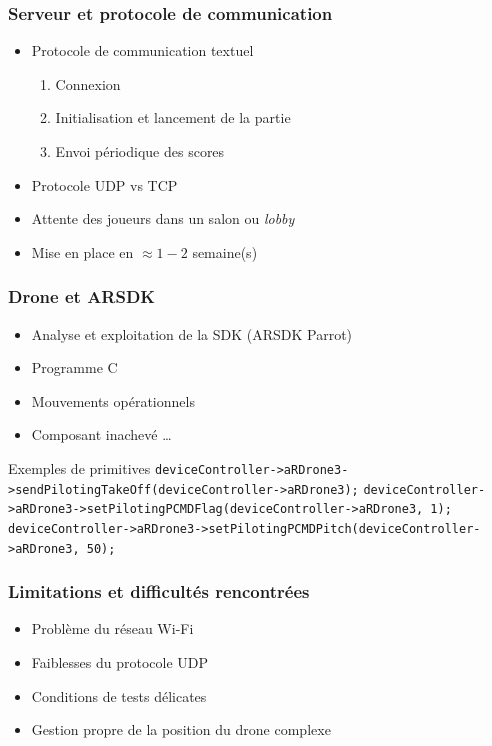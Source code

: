 \begin{frame}
\frametitle{Serveur et protocole de communication}
\begin{center}
\begin{itemize}
\item Protocole de communication textuel
\begin{enumerate}
\item Connexion 
\item Initialisation et lancement de la partie
\item Envoi périodique des scores
\end{enumerate}
\item Protocole UDP vs TCP
\item Attente des joueurs dans un salon ou \textit{lobby}
\item Mise en place en $\approx 1-2$ semaine(s)
\end{itemize}
\end{center}
\end{frame}

\begin{frame}
\frametitle{Drone et ARSDK}
\begin{center}
\begin{itemize}
\item Analyse et exploitation de la SDK (ARSDK Parrot)
\item Programme C
\item Mouvements opérationnels
\item Composant inachevé \dots
\end{itemize}
\begin{exampleblock}{Exemples de primitives}
{\tiny\verb!deviceController->aRDrone3->sendPilotingTakeOff(deviceController->aRDrone3);!
\verb!deviceController->aRDrone3->setPilotingPCMDFlag(deviceController->aRDrone3, 1);!
\verb!deviceController->aRDrone3->setPilotingPCMDPitch(deviceController->aRDrone3, 50);!}
\end{exampleblock}
\end{center}
\end{frame}

\begin{frame}
\frametitle{Limitations et difficultés rencontrées}
\begin{center}
\begin{itemize}
\item Problème du réseau Wi-Fi
\item Faiblesses du protocole UDP
\end{itemize}
\begin{itemize}
\item Conditions de tests délicates
\item Gestion propre de la position du drone complexe
\end{itemize}
\end{center}
\end{frame}